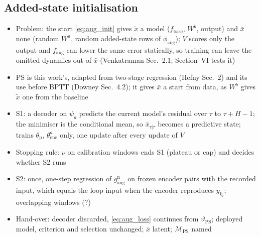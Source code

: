 \subsection{Added-state initialisation}\label{sec:aug_ps2}
\ifdraft
\begin{itemize}
\item Problem: the start \eqref{eq:aug_init} gives $\tilde x$ a model ($f_{\mathrm{base}}$, $W^b$, output) and $\bar x$ none (random $W^a$, random added-state rows of $\phi_{\mathrm{aug}}$); $V$ scores only the output and $f_{\mathrm{aug}}$ can lower the same error statically, so training can leave the omitted dynamics out of $\bar x$ (Venkatraman Sec.~2.1; Section~VI tests it)
\item PS is this work's, adapted from two-stage regression (Hefny Sec.~2) and its use before BPTT (Downey Sec.~4.2); it gives $\bar x$ a start from data, as $W^b$ gives $\tilde x$ one from the baseline
\item S1: a decoder on $\psi_a$ predicts the current model's residual over $\tau$ to $\tau+H-1$; the minimiser is the conditional mean, so $\bar x_{\tau|\tau}$ becomes a predictive state; trains $\theta_{\mathrm p}$, $\theta^a_{\mathrm{enc}}$ only, one update after every update of $V$
\item Stopping rule: $\nu$ on calibration windows ends S1 (plateau or cap) and decides whether S2 runs
\item S2: once, one-step regression of $g^{\mathrm n}_{\mathrm{aug}}$ on frozen encoder pairs with the recorded input, which equals the loop input when the encoder reproduces $y_{k_i}$; overlapping windows (?)
\item Hand-over: decoder discarded, \eqref{eq:aug_loss} continues from $\vartheta_{\mathrm{PS}}$; deployed model, criterion and selection unchanged; $\bar x$ latent; $\mathcal M_{\mathrm{PS}}$ named
\end{itemize}
\fi
{}%
